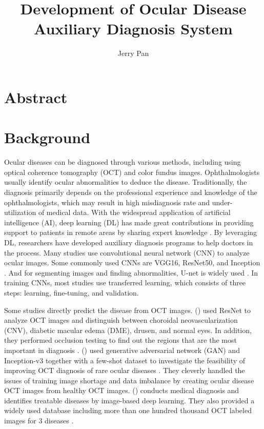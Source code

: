 \documentclass{article}
\newcommand{\authyear}[1]{\citeauthor{#1} (\citeyear{#1})}
\begin{document}
	\title{\vspace{-2.25cm} Development of Ocular Disease Auxiliary Diagnosis System}
	\author{Jerry Pan}
	\date{}
	\maketitle
	
	\section*{Abstract}
	
	
	\pagebreak
	\vspace{0.5cm}
	\tableofcontents
	\pagebreak
	
	\section{Background}
	
		Ocular diseases can be diagnosed through various methods, including using optical coherence tomography (OCT) and color fundus images. Ophthalmologists usually identify ocular abnormalities to deduce the disease.  Traditionally, the diagnosis primarily depends on the professional experience and knowledge of the ophthalmologists, which may result in high misdiagnosis rate and under-utilization of medical data.  With the widespread application of artificial intelligence (AI), deep learning (DL) has made great contributions in providing support to patients in remote areas by sharing expert knowledge \autocite{Ichhpujani_Thakur_2021}.  By leveraging DL, researchers have developed auxiliary diagnosis programs to help doctors in the process. Many studies use convolutional neural network (CNN) to analyze ocular images. Some commonly used CNNs are VGG16, ResNet50, and Inception \autocite{daich2023artificial}.  And for segmenting images and finding abnormalities, U-net is widely used \autocite{Ronneberger_Fischer_Brox_2015}. In training CNNs, most studies use transferred learning, which consists of three steps: learning, fine-tuning, and validation.
		
		Some studies directly predict the disease from OCT images.
		\authyear{li2019deep} used ResNet to analyze OCT images and distinguish between choroidal neovascularization (CNV), diabetic macular edema (DME), drusen, and normal eyes. In addition, they performed occlusion testing to find out the regions that are the most important in diagnosis \autocite{li2019deep}. 
		\authyear{yoo2021feasibility} used generative adversarial network (GAN) and Inception-v3 together with a few-shot dataset to investigate the feasibility of improving OCT diagnosis of rare ocular diseases \autocite{yoo2021feasibility}.  They cleverly handled the issues of training image shortage and data imbalance by creating ocular disease OCT images from healthy OCT images. \authyear{Kermany2018} conducts medical diagnosis and identifies treatable diseases by image-based deep learning.  They also provided a widely used database including more than one hundred thousand OCT labeled images for 3 diseases \autocite{Kermany2018}.
		
\end{document}
